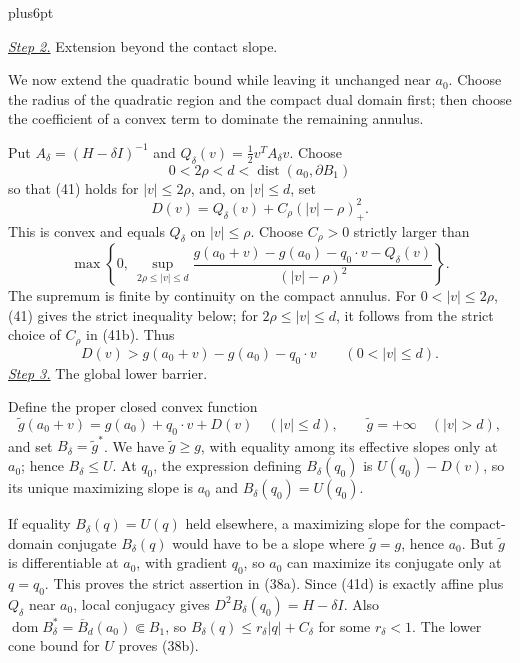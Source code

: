 \documentclass[11pt,reqno]{amsart}
\makeatletter
\theoremstyle{plain}
\theoremstyle{definition}
\theoremstyle{remark}
\renewenvironment{proof}[1][\proofname]{%
  \par
  \pushQED{\qed}%
  \normalfont
  \topsep6pt plus6pt\relax
  \trivlist
  \item[\hskip\labelsep\slshape #1\@addpunct{.}]%
  \ignorespaces
}{%
  \popQED
  \endtrivlist
  \@endpefalse
}
\DeclareRobustCommand{\qed}{%
  \leavevmode\unskip\penalty9999\hbox{}\nobreak
  \ifmmode
    \makebox[0pt][l]{\qquad\hbox{\qedsymbol}}%
  \else
    \qquad\hbox{\qedsymbol}%
  \fi
}
\renewcommand{\qedsymbol}{\rule[.47pt]{4pt}{6pt}}
\numberwithin{equation}{section}
\newcommand{\1}{\mathbf 1}
\makeatother
\begin{document}
\begin{proof}
\smallskip\noindent
\underline{\textit{Step 2.}} Extension beyond the contact slope.

We now extend the quadratic bound while leaving it unchanged near
$a_0$.  Choose the radius of the quadratic region and the compact
dual domain first; then choose the coefficient of a convex term to
dominate the remaining annulus.

Put $A_ \delta=(H-\delta I)^{-1}$ and
$Q_ \delta(v)=\frac12v^TA_ \delta v$.  Choose
\begin{equation*}
0<2\rho<d<\operatorname {dist}(a_ 0,\partial B_ 1)
\end{equation*}
so that (41) holds for $|v|\leq2\rho$, and, on $|v|\leq d$, set
\begin{equation}
D(v)=Q_ \delta(v)+C_ \rho(|v|-\rho)_ +^2.
\tag{41a}
\end{equation}
This is convex and equals $Q_ \delta$ on $|v|\leq\rho$.  Choose
$C_ \rho>0$ strictly larger than
\begin{equation}
\max\!\left\{0,\
\sup_ {2\rho\leq|v|\leq d}
\frac{g(a_ 0+v)-g(a_ 0)-q_ 0\cdot v-Q_ \delta(v)}
{(|v|-\rho)^2}\right\}.
\tag{41b}
\end{equation}
The supremum is finite by continuity on the compact annulus.
For $0<|v|\leq2\rho$, (41) gives the strict inequality below;
for $2\rho\leq|v|\leq d$, it follows from the strict choice of
$C_\rho$ in (41b).  Thus
\begin{equation}
D(v)>g(a_ 0+v)-g(a_ 0)-q_ 0\cdot v
\qquad(0<|v|\leq d).
\tag{41c}
\end{equation}
\smallskip\noindent
\underline{\textit{Step 3.}} The global lower barrier.

Define the proper closed convex function
\begin{equation}
\widetilde g(a_ 0+v)=g(a_ 0)+q_ 0\cdot v+D(v)
\quad(|v|\leq d),\qquad
\widetilde g=+\infty\quad(|v|>d),
\tag{41d}
\end{equation}
and set $B_ \delta=\widetilde g^*$.  We have
$\widetilde g\geq g$, with equality among its effective slopes only
at $a_ 0$; hence $B_ \delta\leq U$.  At $q_ 0$, the expression
defining $B_ \delta(q_ 0)$ is $U(q_ 0)-D(v)$, so its unique maximizing
slope is $a_ 0$ and $B_ \delta(q_ 0)=U(q_ 0)$.

If equality $B_ \delta(q)=U(q)$ held elsewhere, a maximizing slope
for the compact-domain conjugate $B_ \delta(q)$ would have to be a
slope where $\widetilde g=g$, hence $a_ 0$.  But
$\widetilde g$ is differentiable at $a_ 0$, with gradient $q_ 0$,
so $a_ 0$ can maximize its conjugate only at $q=q_ 0$.  This proves
the strict assertion in (38a).  Since (41d) is exactly affine plus
$Q_ \delta$ near $a_ 0$, local conjugacy gives
$D^2B_ \delta(q_ 0)=H-\delta I$.  Also
$\operatorname {dom}B_ \delta^*=\overline B_ d(a_ 0)\Subset B_ 1$,
so $B_ \delta(q)\leq r_ \delta|q|+C_ \delta$ for some
$r_ \delta<1$.  The lower cone bound for $U$ proves (38b).


\end{proof}
\end{document}
